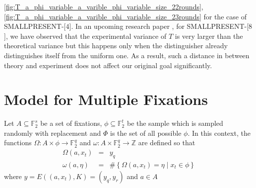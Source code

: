 \ref{fig:T_a_phi_variable_a_varible_phi_variable_size_22rounds},
\ref{fig:T_a_phi_variable_a_varible_phi_variable_size_23rounds} for the case of SMALLPRESENT-[$4$]. In an upcoming research paper \citep{kaisa_mohsin_2015}, for SMALLPRESENT-[$8$], we have observed that the experimental variance of $T$ is very larger than the theoretical variance but this happens only when the distinguisher already distinguishes itself from the uniform one. As a result, such a distance in between theory and experiment does not affect our original goal significantly.

\section{Model for Multiple Fixations} \label{section:model_for_multiple_fixations}
Let $A \subseteq \mathbb{F}_{2}^{s}$ be a set of fixations, $\phi \subseteq \mathbb{F}_2^t$ be the sample which is sampled randomly with replacement and $\Phi$ is the set of all possible $\phi$. In this context, the functions $\Omega: A \times \phi \rightarrow \mathbb{F}_2^q$ and $\omega:A \times \mathbb{F}_2^q \rightarrow \mathbb{Z}$ are defined so that
\begin{eqnarray}
\Omega(a,x_t) &=& y_q \\
\omega\left(a,\eta \right) &=&  \# \left\lbrace \Omega\left(a,x_t \right) = \eta \; \vert \; x_t \in \phi \right\rbrace  \label{eqn:omega_a_eta}
\end{eqnarray} where $y = E\left(\left(a,x_t\right),K\right) = (y_q,y_r)$ and $a \in A$

